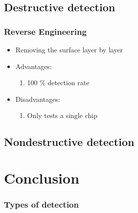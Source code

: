 \documentclass[11pt]{beamer}
\begin{document}
\subsection{Destructive detection}
\begin{frame}
    \frametitle{Reverse Engineering}
    \begin{itemize}
        \item Removing the surface layer by layer
        \item Advantages: 
        \begin{enumerate}
            \item 100 \% detection rate
        \end{enumerate}
        \item Disadvantages:
        \begin{enumerate}
            \item Only tests a single chip
        \end{enumerate}
    \end{itemize}
\end{frame}
\subsection{Nondestructive detection}
\section{Conclusion}
\begin{frame}
    \frametitle{Types of detection}
\end{frame}
\end{document}
